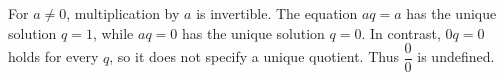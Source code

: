 For $a\ne0$, multiplication by $a$ is invertible. The equation $aq=a$ has the unique solution $q=1$, while $aq=0$ has the unique solution $q=0$. In contrast, $0q=0$ holds for every $q$, so it does not specify a unique quotient. Thus $\dfrac{0}{0}$ is undefined.
